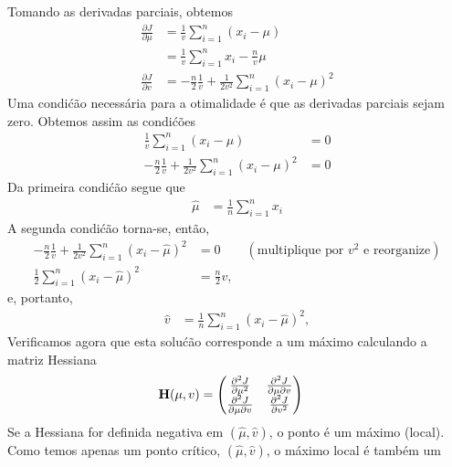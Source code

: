 \begin{exenumerate}
\begin{solution}
        Tomando as derivadas parciais, obtemos
        \begin{align}
            \frac{\partial J }{\partial\mu} & = \frac{1}{v} \sum_{i=1}^n (x_i-\mu)\\
            &= \frac{1}{v} \sum_{i=1}^n x_i  -\frac{n}{v} \mu\\
            \frac{\partial J}{\partial v} &= -\frac{n}{2} \frac{1}{v} + \frac{1}{2v^2} \sum_{i=1}^n (x_i-\mu)^2
        \end{align}
        Uma condi\'c\~ao necess\'aria para a otimalidade \'e que as derivadas parciais sejam zero. Obtemos assim as condi\'c\~oes
        \begin{align}
            \frac{1}{v} \sum_{i=1}^n (x_i-\mu) &=0\\
            -\frac{n}{2} \frac{1}{v} + \frac{1}{2v^2} \sum_{i=1}^n (x_i-\mu)^2 & = 0
        \end{align}
        Da primeira condi\'c\~ao segue que
        \begin{align}
            \hat{\mu} &= \frac{1}{n}\sum_{i=1}^n x_i
        \end{align}
        A segunda condi\'c\~ao torna-se, ent\~ao,
        \begin{align}
            -\frac{n}{2} \frac{1}{v} + \frac{1}{2v^2} \sum_{i=1}^n (x_i-\hat{\mu})^2 & = 0 \quad \quad (\text{multiplique por } v^2 \text{ e reorganize})\\
            \frac{1}{2} \sum_{i=1}^n (x_i-\hat{\mu})^2 & = \frac{n}{2} v,
        \end{align}
        e, portanto,
        \begin{align}
            \hat{v} & = \frac{1}{n} \sum_{i=1}^n (x_i-\hat{\mu})^2,
        \end{align}
        Verificamos agora que esta solu\'c\~ao corresponde a um m\'aximo calculando a matriz Hessiana
        \begin{align}
            \mathbf{H}(\mu, v) & = \begin{pmatrix}
                \frac{\partial^2 J }{\partial \mu^2} & \frac{\partial^2 J }{\partial \mu \partial v}\\
                \frac{\partial^2 J }{\partial \mu \partial v} & \frac{\partial^2 J }{\partial v^2}
            \end{pmatrix}
        \end{align}
        Se a Hessiana for definida negativa em $(\hat{\mu}, \hat{v})$, o
        ponto \'e um m\'aximo (local). Como temos apenas um ponto cr\'itico,
        $(\hat{\mu}, \hat{v})$, o m\'aximo local \'e tamb\'em um

\end{solution}
\end{exenumerate}
